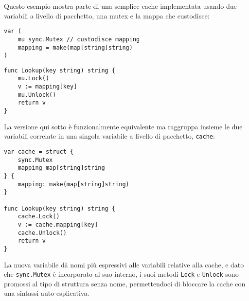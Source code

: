 Questo esempio mostra parte di una semplice cache implementata usando due variabili a livello di pacchetto, una mutex e la mappa che custodisce:
\begin{lstlisting}[frame=single, label={lst:lstlisting5-3.8}]
var (
    mu sync.Mutex // custodisce mapping
    mapping = make(map[string]string)
)
\end{lstlisting}
\begin{lstlisting}[frame=single, label={lst:lstlisting5-3.9}]
func Lookup(key string) string {
    mu.Lock()
    v := mapping[key]
    mu.Unlock()
    return v
}
\end{lstlisting}
La versione qui sotto è funzionalmente equivalente ma raggruppa insieme le due variabili correlate in una singola variabile a livello di pacchetto, \verb|cache|:
\begin{lstlisting}[frame=single, label={lst:lstlisting5-3.10}]
var cache = struct {
    sync.Mutex
    mapping map[string]string
} {
    mapping: make(map[string]string)
}

func Lookup(key string) string {
    cache.Lock()
    v := cache.mapping[key]
    cache.Unlock()
    return v
}
\end{lstlisting}
La nuova variabile dà nomi più espressivi alle variabili relative alla cache, e dato che \verb|sync.Mutex| è incorporato al suo interno, i suoi metodi \verb|Lock| e \verb|Unlock| sono promossi al tipo di struttura senza nome, permettendoci di bloccare la cache con una sintassi auto-esplicativa.